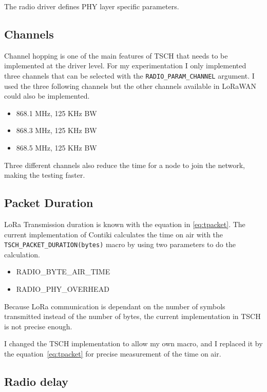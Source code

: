 The radio driver defines PHY layer specific parameters.

\subsection{Channels}

Channel hopping is one of the main features of TSCH that needs to be implemented
at the driver level.
For my experimentation I only implemented three channels that can be selected
with the \lstinline{RADIO_PARAM_CHANNEL} argument.
I used the three following channels but the other channels available in LoRaWAN
could also be implemented.

\begin{itemize}
  \item 868.1 MHz, 125 KHz BW
  \item 868.3 MHz, 125 KHz BW
  \item 868.5 MHz, 125 KHz BW
\end{itemize}

Three different channels also reduce the time for a node to join the network,
making the testing faster.

\subsection{Packet Duration\label{section:transmissiontime}}

LoRa Transmission duration is known with the equation in \ref{eq:tpacket}.
The current implementation of Contiki calculates the time on air with the
\lstinline{TSCH_PACKET_DURATION(bytes)} macro by using two parameters to do the
calculation.

\begin{itemize}
  \item RADIO\_BYTE\_AIR\_TIME
  \item RADIO\_PHY\_OVERHEAD
\end{itemize}

Because LoRa communication is dependant on the number of symbols transmitted
instead of the number of bytes, the current implementation in TSCH is not
precise enough.

I changed the TSCH implementation to allow my own macro, and
I replaced it by the equation~\ref{eq:tpacket} for precise measurement
of the time on air.

\subsection{Radio delay}

